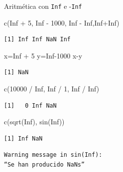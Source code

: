 \documentclass[
  ignorenonframetext,
  aspectratio=169,
  spanish,
]{beamer}
\newenvironment{Shaded}{\begin{snugshade}}{\end{snugshade}}
\newcommand{\ConstantTok}[1]{\textcolor[rgb]{0.56,0.35,0.01}{#1}}
\newcommand{\DecValTok}[1]{\textcolor[rgb]{0.68,0.00,0.00}{#1}}
\newcommand{\FunctionTok}[1]{\textcolor[rgb]{0.28,0.35,0.67}{#1}}
\newcommand{\NormalTok}[1]{\textcolor[rgb]{0.00,0.23,0.31}{#1}}
\newcommand{\OtherTok}[1]{\textcolor[rgb]{0.00,0.23,0.31}{#1}}
\newcommand{\SpecialCharTok}[1]{\textcolor[rgb]{0.37,0.37,0.37}{#1}}
\begin{document}
\begin{frame}[fragile]{Aritmética con \texttt{Inf} e -\texttt{Inf}}
\label{aritmuxe9tica-con-inf-e--inf}
\begin{Shaded}
\begin{Highlighting}[]
\FunctionTok{c}\NormalTok{(}\ConstantTok{Inf} \SpecialCharTok{+} \DecValTok{5}\NormalTok{, }\ConstantTok{Inf} \SpecialCharTok{{-}} \DecValTok{1000}\NormalTok{, }\ConstantTok{Inf} \SpecialCharTok{{-}} \ConstantTok{Inf}\NormalTok{,}\ConstantTok{Inf}\SpecialCharTok{+}\ConstantTok{Inf}\NormalTok{)  }
\end{Highlighting}
\end{Shaded}

\begin{verbatim}
[1] Inf Inf NaN Inf
\end{verbatim}
\end{frame}

\begin{frame}[fragile]{}
\label{section-3}
\begin{Shaded}
\begin{Highlighting}[]
\NormalTok{x}\OtherTok{=}\ConstantTok{Inf} \SpecialCharTok{+} \DecValTok{5} 
\NormalTok{y}\OtherTok{=}\ConstantTok{Inf}\DecValTok{{-}1000}
\NormalTok{x}\SpecialCharTok{{-}}\NormalTok{y}
\end{Highlighting}
\end{Shaded}

\begin{verbatim}
[1] NaN
\end{verbatim}

\begin{Shaded}
\begin{Highlighting}[]
\FunctionTok{c}\NormalTok{(}\DecValTok{10000} \SpecialCharTok{/} \ConstantTok{Inf}\NormalTok{, }\ConstantTok{Inf} \SpecialCharTok{/} \DecValTok{1}\NormalTok{, }\ConstantTok{Inf} \SpecialCharTok{/} \ConstantTok{Inf}\NormalTok{) }
\end{Highlighting}
\end{Shaded}

\begin{verbatim}
[1]   0 Inf NaN
\end{verbatim}

\begin{Shaded}
\begin{Highlighting}[]
\FunctionTok{c}\NormalTok{(}\FunctionTok{sqrt}\NormalTok{(}\ConstantTok{Inf}\NormalTok{), }\FunctionTok{sin}\NormalTok{(}\ConstantTok{Inf}\NormalTok{)) }
\end{Highlighting}
\end{Shaded}

\begin{verbatim}
[1] Inf NaN
\end{verbatim}

\begin{verbatim}
Warning message in sin(Inf):
“Se han producido NaNs”
\end{verbatim}
\end{frame}
\end{document}
